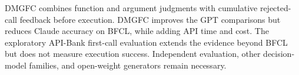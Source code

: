 DMGFC combines function and argument judgments with cumulative rejected-call feedback before execution. DMGFC improves the GPT comparisons but reduces Claude accuracy on BFCL, while adding API time and cost. The exploratory API-Bank first-call evaluation extends the evidence beyond BFCL but does not measure execution success. Independent evaluation, other decision-model families, and open-weight generators remain necessary.
